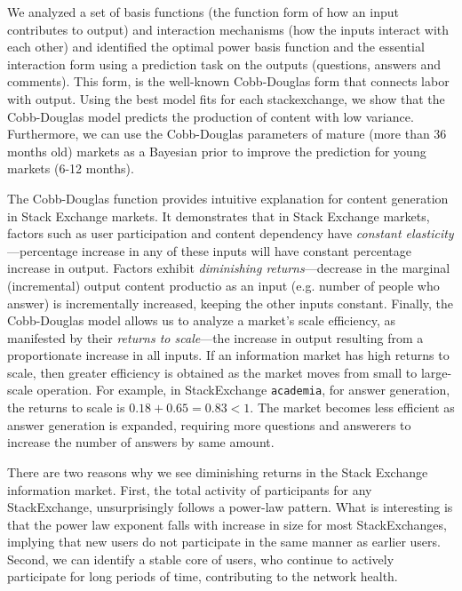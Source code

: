 We analyzed a set of basis functions (the function form of how an input contributes to output) and interaction mechanisms (how the inputs interact with each other) and identified the optimal power basis function and the essential interaction form using a prediction task on the outputs (questions, answers and comments). This form, is the well-known Cobb-Douglas form that connects labor with output. Using the best model fits for each stackexchange, we show that the Cobb-Douglas model predicts the production of content with low variance. Furthermore, we can use the Cobb-Douglas parameters of mature (more than 36 months old) markets as a Bayesian prior to improve the prediction for young markets (6-12 months).

The Cobb-Douglas function provides intuitive explanation for content generation in Stack Exchange markets. It demonstrates that in Stack Exchange markets, factors such as user participation and content dependency have \emph{constant elasticity}---percentage increase in any of these inputs will have constant percentage increase in output. Factors exhibit \emph{diminishing returns}---decrease in the marginal (incremental) output content productio as an input (e.g. number of people who answer) is incrementally increased, keeping the other inputs constant. Finally, the Cobb-Douglas model allows us to analyze a market's scale efficiency, as manifested by their \emph{returns to scale}---the increase in output resulting from a proportionate increase in all inputs. If an information market has high returns to scale, then greater efficiency is obtained as the market moves from small to large-scale operation. For example, in StackExchange \texttt{academia}, for answer generation, the returns to scale is $0.18+0.65=0.83<1$. The market becomes less efficient as answer generation is expanded, requiring more questions and answerers to increase the number of answers by same amount.

There are two reasons why we see diminishing returns in the Stack Exchange information market. First, the total activity of participants for any StackExchange, unsurprisingly follows a power-law pattern. What is interesting is that the power law exponent falls with increase in size for most StackExchanges, implying that new users do not participate in the same manner as earlier users. Second, we can identify a stable core of users, who continue to actively participate for long periods of time, contributing to the network health.

